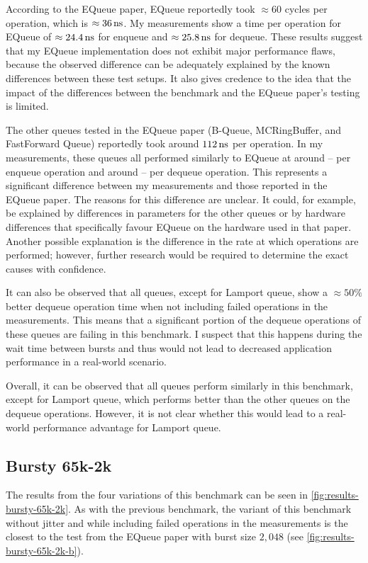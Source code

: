 According to the EQueue paper, EQueue reportedly took $\approx 60$ cycles per operation, which is
$\approx \SI{36}{\nano\second}$.
My measurements show a time per operation for EQueue of $\approx \SI{24.4}{\nano\second}$ for enqueue and
$\approx \SI{25.8}{\nano\second}$ for dequeue.
These results suggest that my EQueue implementation does not exhibit major performance flaws, because the
observed difference can be adequately explained by the known differences between these test setups.
It also gives credence to the idea that the impact of the differences between the benchmark and the EQueue
paper's testing is limited.

The other queues tested in the EQueue paper (B-Queue, MCRingBuffer, and FastForward Queue) reportedly took
around $\SI{112}{\nano\second}$ per operation.
In my measurements, these queues all performed similarly to EQueue at around -- per enqueue operation
and around -- per dequeue operation.
This represents a significant difference between my measurements and those reported in the EQueue paper.
The reasons for this difference are unclear.
It could, for example, be explained by differences in parameters for the other queues or by hardware
differences that specifically favour EQueue on the hardware used in that paper.
Another possible explanation is the difference in the rate at which operations are performed;
however, further research would be required to determine the exact causes with confidence.

It can also be observed that all queues, except for Lamport queue, show a $\approx 50\%$ better dequeue
operation time when not including failed operations in the measurements.
This means that a significant portion of the dequeue operations of these queues are failing in this benchmark.
I suspect that this happens during the wait time between bursts and thus would not lead to decreased
application performance in a real-world scenario.

Overall, it can be observed that all queues perform similarly in this benchmark, except for Lamport queue,
which performs better than the other queues on the dequeue operations.
However, it is not clear whether this would lead to a real-world performance advantage for Lamport queue.

\subsection{Bursty 65k-2k}

The results from the four variations of this benchmark can be seen in \autoref{fig:results-bursty-65k-2k}.
As with the previous benchmark, the variant of this benchmark without jitter and while including failed
operations in the measurements is the closest to the test from the EQueue paper with burst size $2,048$ (see
\autoref{fig:results-bursty-65k-2k-b}).

